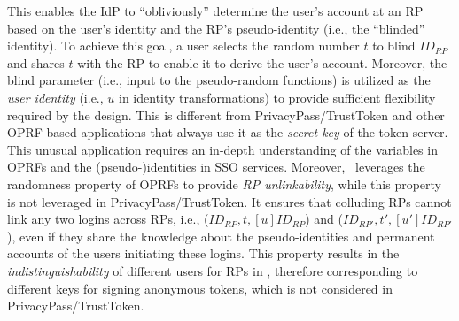 This enables the IdP to ``obliviously'' determine the user's account at an RP based on the user's identity and the RP's pseudo-identity (i.e., the ``blinded'' identity).
To achieve this goal, a user selects the random number $t$ to blind $ID_{RP}$ and shares $t$ with the RP to enable it to derive the user's account. %
Moreover, the blind parameter (i.e., input to the pseudo-random functions) is utilized as the \emph{user identity} (i.e., $u$ in identity transformations) to provide sufficient flexibility required by the design. This is different from PrivacyPass/TrustToken and other OPRF-based applications \cite{privacypass,trusttoken,strong-oprf,oprf-bitcoin-wallet,pesto,oprf-ot-si,pp-ss,Private-Contact-Discovery,o-kms,oprf-deduplication} that always use it as the \emph{secret key} of the token server.%
This unusual application requires an in-depth understanding of the variables in OPRFs and the (pseudo-)identities in SSO services.
Moreover, \usso\ leverages the randomness property of OPRFs
 to provide \emph{RP unlinkability}, while this property is not leveraged in PrivacyPass/TrustToken.
It ensures that colluding RPs cannot link any two logins across RPs, i.e., ($ID_{RP}, t, [u]ID_{RP}$) and ($ID_{RP'}, t', [u']ID_{RP'}$),
  even if they share the knowledge about the pseudo-identities and permanent accounts of the users initiating these logins.
This property results in the \emph{indistinguishability} of different users for RPs in \usso,
    therefore corresponding to different keys for signing anonymous tokens,
    which is not considered in PrivacyPass/TrustToken.

